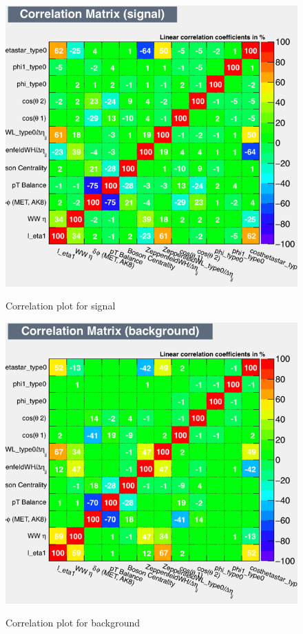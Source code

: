 \begin{figure}[h!]
	 \centering
	 {\includegraphics[width=1.2\textwidth, angle =90]{Plots/BDT_Performance/Trial2/dataset/plots/CorrelationMatrixS.png}}
	 \caption{Correlation plot for signal}
\end{figure}
\begin{figure}[h!]\ContinuedFloat
	 {\includegraphics[width=1.2\textwidth, angle =90]{Plots/BDT_Performance/Trial2/dataset/plots/CorrelationMatrixB.png}}
	 \caption{Correlation plot for background}
\end{figure}

